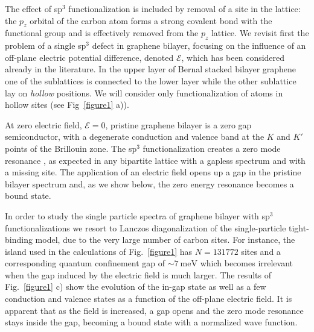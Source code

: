 The effect of sp$^3$ functionalization is included by removal of a site in the lattice\cite{}: the $p_z$ orbital of the carbon atom forms a strong covalent bond with the functional group and is effectively removed from the $p_z$ lattice\cite{}. We revisit first the problem of a single sp$^3$ defect in graphene bilayer\cite{Castro2010}, focusing on the influence of an off-plane electric potential difference, denoted $\mathcal{E}$, which has been considered already in the literature\cite{Nilsson2007}.
In the upper layer of Bernal stacked bilayer graphene one of the sublattices is connected to the lower layer while the other sublattice lay on \emph{hollow} positions. We will consider only functionalization of atoms in hollow sites (see Fig~\ref{figure1} a)). 

At zero electric field, $\mathcal{E}=0$, pristine graphene bilayer is a zero gap semiconductor, with a degenerate conduction and valence band at the $K$ and $K'$ points of the Brillouin zone\cite{McCann2012}. The sp$^3$ functionalization creates a zero mode resonance \cite{Nilsson2007,Castro2010}, as expected in any bipartite lattice with a gapless spectrum and with a missing site.\cite{Lieb1989} %
The application of an electric field opens up a gap in the pristine bilayer spectrum and, as we show below, the zero energy resonance becomes a bound state.

In order to study the single particle spectra of graphene bilayer with sp$^3$ functionalizations we resort to Lanczos diagonalization\cite{Lanczos1950, Arnoldi1951} of the single-particle tight-binding model, due to the very large number of carbon sites. For instance, the island used in the calculations of Fig.~\ref{figure1} has $N=131772$ sites and a corresponding quantum confinement gap of $\sim\SI{7}{\meV}$ which becomes irrelevant when the gap induced by the electric field is much larger. 
The results of Fig.~\ref{figure1} c) show the evolution of the in-gap state as well as a few conduction and valence states as a function of the off-plane electric field. It is apparent that as the field is increased, a gap opens and the zero mode resonance stays inside the gap, becoming a bound state with a normalized wave function.


